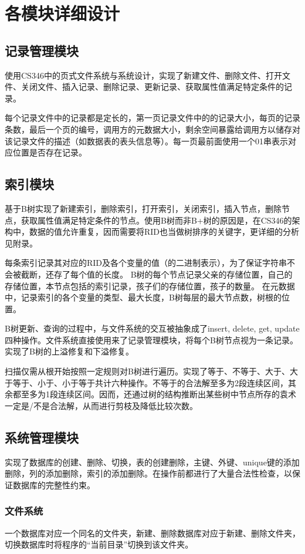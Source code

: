 \documentclass{article}
\begin{document}
\section{各模块详细设计}
\subsection{记录管理模块}
使用CS346中的页式文件系统与系统设计，实现了新建文件、删除文件、打开文件、关闭文件、插入记录、删除记录、更新记录、获取属性值满足特定条件的记录。

每个记录文件中的记录都是定长的，第一页记录文件中的的记录大小，每页的记录条数，最后一个页的编号，调用方的元数据大小，剩余空间暴露给调用方以储存对该记录文件的描述（如数据表的表头信息等）。每一页最前面使用一个01串表示对应位置是否存在记录。

\subsection{索引模块}
基于B树实现了新建索引，删除索引，打开索引，关闭索引，插入节点，删除节点，获取属性值满足特定条件的节点。使用B树而非B+树的原因是，在CS346的架构中，数据的值允许重复，因而需要将RID也当做树排序的关键字，更详细的分析见附录。

每条索引记录其对应的RID及各个变量的值（的二进制表示），为了保证字符串不会被截断，还存了每个值的长度。
B树的每个节点记录父亲的存储位置，自己的存储位置，本节点包括的索引记录，孩子们的存储位置，孩子的数量。
在元数据中，记录索引的各个变量的类型、最大长度，B树每层的最大节点数，树根的位置。

B树更新、查询的过程中，与文件系统的交互被抽象成了insert, delete, get, update四种操作。文件系统直接使用来了记录管理模块，将每个B树节点视为一条记录。实现了B树的上溢修复和下溢修复。

扫描仅需从根开始按照一定规则对B树进行遍历。实现了等于、不等于、大于、大于等于、小于、小于等于共计六种操作。不等于的合法解至多为2段连续区间，其余都至多为1段连续区间。因而，还通过树的结构推断出某些树中节点所存的袁术一定是/不是合法解，从而进行剪枝及降低比较次数。

\subsection{系统管理模块}
实现了数据库的创建、删除、切换，表的创建删除，主键、外键、unique键的添加删除，列的添加删除，索引的添加删除。在操作前都进行了大量合法性检查，以保证数据库的完整性约束。
\subsubsection{文件系统}
一个数据库对应一个同名的文件夹，新建、删除数据库对应于新建、删除文件夹，切换数据库时将程序的“当前目录”切换到该文件夹。
\end{document}
